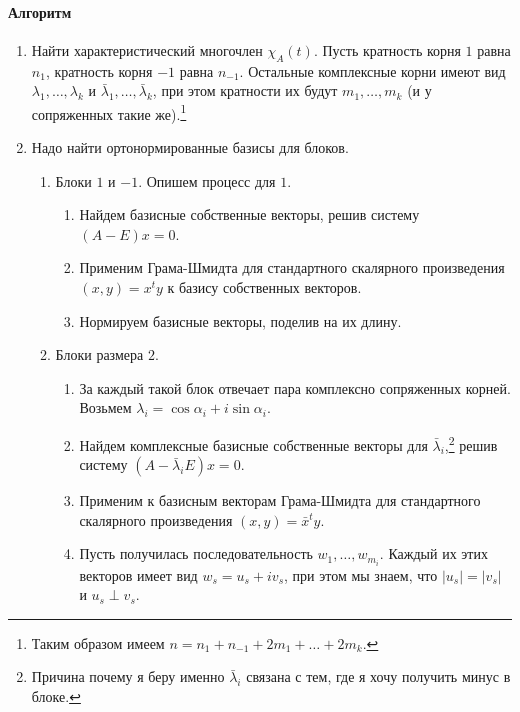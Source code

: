 \documentclass{article}
\begin{document}
\paragraph{Алгоритм}
\begin{enumerate}
\item Найти характеристический многочлен $\chi_A(t)$. Пусть кратность корня $1$ равна $n_1$, кратность корня $-1$ равна $n_{-1}$. Остальные комплексные корни имеют вид $\lambda_1,\ldots,\lambda_k$ и $\bar\lambda_1,\ldots,\bar\lambda_k$, при этом кратности их будут $m_1,\ldots,m_k$ (и у сопряженных такие же).\footnote{Таким образом имеем $n = n_1 + n_{-1} + 2 m_1 + \ldots + 2 m_k$.}

\item Надо найти ортонормированные базисы для блоков.
\begin{enumerate}
\item Блоки $1$ и $-1$. Опишем процесс для $1$.
\begin{enumerate}
\item Найдем базисные собственные векторы, решив систему $(A- E)x = 0$.
\item Применим Грама-Шмидта для стандартного скалярного произведения $(x, y) = x^ty$ к базису собственных векторов.
\item Нормируем базисные векторы, поделив на их длину.
\end{enumerate}

\item Блоки размера $2$.
\begin{enumerate}
\item За каждый такой блок отвечает пара комплексно сопряженных корней. Возьмем $\lambda_i = \cos \alpha_i + i \sin\alpha_i$.

\item Найдем комплексные базисные собственные векторы для $\bar \lambda_i$,\footnote{Причина почему я беру именно $\bar\lambda_i$ связана с тем, где я хочу получить минус в блоке.} решив систему $(A - \bar\lambda_iE)x = 0$.

\item Применим к базисным векторам Грама-Шмидта для стандартного скалярного произведения $(x, y) = \bar x^ty$.

\item Пусть получилась последовательность $w_1,\ldots,w_{m_i}$. Каждый их этих векторов имеет вид $w_s = u_s + i v_s$, при этом мы знаем, что $|u_s| = |v_s|$ и $u_s\perp v_s$.


\end{enumerate}
\end{enumerate}
\end{enumerate}
\end{document}
